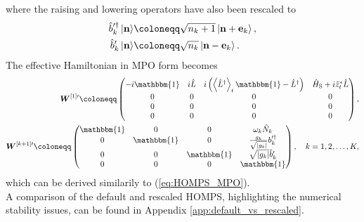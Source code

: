 where the raising and lowering operators have also been rescaled to
\begin{equation*}
    \begin{split}
        \hat{b}_k^{\prime\dagger} \ket*{\vb{n}} &\coloneqq \sqrt{n_k + 1} \ket*{\vb{n} + \vb{e}_k}, \\
        \hat{b}_k^\prime \ket*{\vb{n}} &\coloneqq \sqrt{n_k} \ket*{\vb{n} - \vb{e}_k}. \\
    \end{split}
\end{equation*}
The effective Hamiltonian in MPO form becomes
\begin{equation}
    \label{eq:HOMPS_MPO_rescaled}
    \begin{aligned}
        \vb*{W}^{[1]\prime} \coloneqq
        \begin{pmatrix}
            -i\mathbbm{1} & i\hat{L} & i\left(\left\langle \hat{L}^\dagger\right\rangle_t \mathbbm{1} - \hat{L}^\dagger\right) & \hat{H}_\text{S} + i\tilde{z}_t^*\hat{L} \\
            0            & 0        & 0                                                                                    & 0                                        \\
            0            & 0        & 0                                                                                    & 0                                        \\
            0            & 0        & 0                                                                                    & 0                                        \\
        \end{pmatrix},\\
        \vb*{W}^{[k+1]\prime} \coloneqq
        \begin{pmatrix}
            \mathbbm{1} & 0          & 0          & \omega_k\hat{N}_k                          \\
            0          & \mathbbm{1} & 0          & \frac{g_k}{\sqrt{\abs{g_k }}} b_k^{\prime\dagger} \\
            0          & 0          & \mathbbm{1} & \sqrt{\abs{g_k}} \hat{b}_k^\prime          \\
            0          & 0          & 0          & \mathbbm{1}                                 \\
        \end{pmatrix}, \quad k = 1, 2, \dots, K,
    \end{aligned}
\end{equation}
which can be derived similarily to (\ref{eq:HOMPS_MPO}). \\
A comparison of the default and rescaled HOMPS, highlighting the numerical stability issues, can be found in Appendix \ref{app:default_vs_rescaled}.